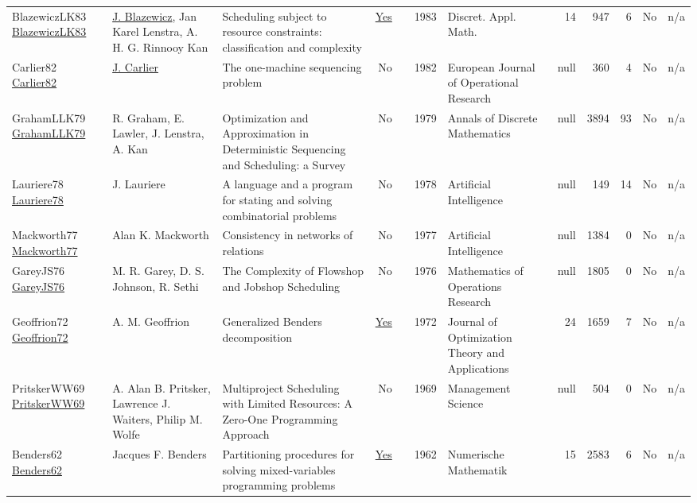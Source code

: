 {\begin{longtable}{>{\raggedright\arraybackslash}p{3cm}>{\raggedright\arraybackslash}p{6cm}>{\raggedright\arraybackslash}p{6.5cm}rrrp{2.5cm}rrrrr}
BlazewiczLK83 \href{https://doi.org/10.1016/0166-218X(83)90012-4}{BlazewiczLK83} & \hyperref[auth:a768]{J. Blazewicz}, Jan Karel Lenstra, A. H. G. Rinnooy Kan & Scheduling subject to resource constraints: classification and complexity & \href{../works/BlazewiczLK83.pdf}{Yes} & \cite{BlazewiczLK83} & 1983 & Discret. Appl. Math. & 14 & 947 & 6 & No & n/a\\
Carlier82 \href{http://dx.doi.org/10.1016/s0377-2217(82)80007-6}{Carlier82} & \hyperref[auth:a849]{J. Carlier} & The one-machine sequencing problem & No & \cite{Carlier82} & 1982 & European Journal of Operational Research & null & 360 & 4 & No & n/a\\
GrahamLLK79 \href{http://dx.doi.org/10.1016/s0167-5060(08)70356-x}{GrahamLLK79} & R. Graham, E. Lawler, J. Lenstra, A. Kan & Optimization and Approximation in Deterministic Sequencing and Scheduling: a Survey & No & \cite{GrahamLLK79} & 1979 & Annals of Discrete Mathematics & null & 3894 & 93 & No & n/a\\
Lauriere78 \href{http://dx.doi.org/10.1016/0004-3702(78)90029-2}{Lauriere78} & J. Lauriere & A language and a program for stating and solving combinatorial problems & No & \cite{Lauriere78} & 1978 & Artificial Intelligence & null & 149 & 14 & No & n/a\\
Mackworth77 \href{http://dx.doi.org/10.1016/0004-3702(77)90007-8}{Mackworth77} & Alan K. Mackworth & Consistency in networks of relations & No & \cite{Mackworth77} & 1977 & Artificial Intelligence & null & 1384 & 0 & No & n/a\\
GareyJS76 \href{http://dx.doi.org/10.1287/moor.1.2.117}{GareyJS76} & M. R. Garey, D. S. Johnson, R. Sethi & The Complexity of Flowshop and Jobshop Scheduling & No & \cite{GareyJS76} & 1976 & Mathematics of Operations Research & null & 1805 & 0 & No & n/a\\
Geoffrion72 \href{http://dx.doi.org/10.1007/bf00934810}{Geoffrion72} & A. M. Geoffrion & Generalized Benders decomposition & \href{../works/Geoffrion72.pdf}{Yes} & \cite{Geoffrion72} & 1972 & Journal of Optimization Theory and Applications & 24 & 1659 & 7 & No & n/a\\
PritskerWW69 \href{http://dx.doi.org/10.1287/mnsc.16.1.93}{PritskerWW69} & A. Alan B. Pritsker, Lawrence J. Waiters, Philip M. Wolfe & Multiproject Scheduling with Limited Resources: A Zero-One Programming Approach & No & \cite{PritskerWW69} & 1969 & Management Science & null & 504 & 0 & No & n/a\\
Benders62 \href{http://dx.doi.org/10.1007/bf01386316}{Benders62} & Jacques F. Benders & Partitioning procedures for solving mixed-variables programming problems & \href{../works/Benders62.pdf}{Yes} & \cite{Benders62} & 1962 & Numerische Mathematik & 15 & 2583 & 6 & No & n/a\\
\end{longtable}
}

